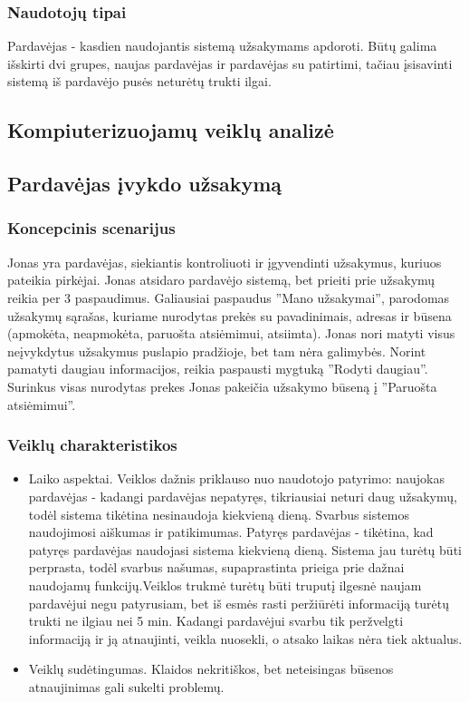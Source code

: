 \documentclass[oneside]{VUMIFPSkursinis}
\begin{document}
		\subsubsection{Naudotojų tipai}
			Pardavėjas - kasdien naudojantis sistemą užsakymams apdoroti.
			Būtų galima išskirti dvi grupes, naujas pardavėjas ir pardavėjas su patirtimi, tačiau įsisavinti sistemą iš pardavėjo pusės neturėtų trukti ilgai.
	\subsection{Kompiuterizuojamų veiklų analizė}

	\subsection{Pardavėjas įvykdo užsakymą}
		\subsubsection{Koncepcinis scenarijus}
			Jonas yra pardavėjas, siekiantis kontroliuoti ir įgyvendinti užsakymus, kuriuos pateikia pirkėjai. Jonas atsidaro pardavėjo sistemą, bet prieiti prie užsakymų reikia per 3 paspaudimus. Galiausiai paspaudus ''Mano užsakymai'', parodomas užsakymų sąrašas, kuriame nurodytas prekės su pavadinimais, adresas ir būsena (apmokėta, neapmokėta, paruošta atsiėmimui, atsiimta). Jonas nori matyti visus neįvykdytus užsakymus puslapio pradžioje, bet tam nėra galimybės. Norint pamatyti daugiau informacijos, reikia paspausti mygtuką ''Rodyti daugiau''.  Surinkus visas nurodytas prekes Jonas pakeičia užsakymo būseną į ''Paruošta atsiėmimui''.

		\subsubsection{Veiklų charakteristikos}
		\begin{itemize}
	\item{Laiko aspektai. Veiklos dažnis  priklauso nuo naudotojo patyrimo: naujokas pardavėjas - kadangi pardavėjas nepatyręs, tikriausiai neturi daug užsakymų, todėl sistema tikėtina nesinaudoja kiekvieną dieną. Svarbus sistemos naudojimosi aiškumas ir patikimumas. Patyręs pardavėjas - tikėtina, kad patyręs pardavėjas naudojasi sistema kiekvieną dieną. Sistema jau turėtų būti perprasta, todėl svarbus našumas, supaprastinta prieiga prie dažnai naudojamų funkcijų.Veiklos trukmė turėtų būti truputį ilgesnė naujam pardavėjui negu patyrusiam, bet iš esmės rasti peržiūrėti informaciją turėtų trukti ne ilgiau nei 5 min. Kadangi pardavėjui svarbu tik peržvelgti informaciją ir ją atnaujinti, veikla nuosekli, o atsako laikas nėra tiek aktualus.}
	\item{Veiklų sudėtingumas. Klaidos nekritiškos, bet neteisingas būsenos atnaujinimas gali sukelti problemų.}
	\end{itemize}
\end{document}
